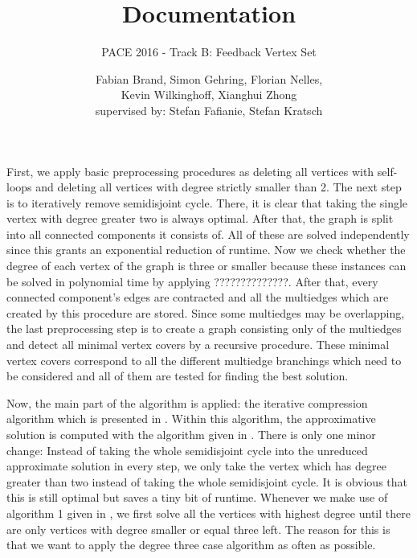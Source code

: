 \documentclass[11pt,a4paper]{scrartcl}
\begin{document}
\title{Documentation}
\subtitle{PACE 2016 - Track B: Feedback Vertex Set}
\author{Fabian Brand, Simon Gehring, Florian Nelles,\\ Kevin Wilkinghoff, Xianghui Zhong\\
	supervised by: Stefan Fafianie, Stefan Kratsch}
\maketitle

First, we apply basic preprocessing procedures as deleting all vertices with self-loops and deleting all vertices with degree strictly smaller than 2. The next step is to iteratively remove semidisjoint cycle. There, it is clear that taking the single vertex with degree greater two is always optimal. After that, the graph is split into all connected components it consists of. All of these are solved independently since this grants an exponential reduction of runtime. Now we check whether the degree of each vertex of the graph is three or smaller because these instances can be solved in polynomial time by applying ??????????????. After that, every connected component's edges are contracted and all the multiedges which are created by this procedure are stored. Since some multiedges may be overlapping, the last preprocessing step is to create a graph consisting only of the multiedges and detect all minimal vertex covers by a recursive procedure. These minimal vertex covers correspond to all the different multiedge branchings which need to be considered and all of them are tested for finding the best solution.
\par 
Now, the main part of the algorithm is applied: the iterative compression algorithm which is presented in \cite{chen2008}. Within this algorithm, the approximative solution is computed with the algorithm given in \cite{bafna1999}. There is only one minor change: Instead of taking the whole semidisjoint cycle into the unreduced approximate solution in every step, we only take the vertex which has degree greater than two instead of taking the whole semidisjoint cycle. It is obvious that this is still optimal but saves a tiny bit of runtime. Whenever we make use of algorithm 1 given in \cite{chen2008}, we first solve all the vertices with highest degree until there are only vertices with degree smaller or equal three left. The reason for this is that we want to apply the degree three case algorithm as often as possible.

\nocite{bafna1999}
\nocite{chen2008}


\end{document}
